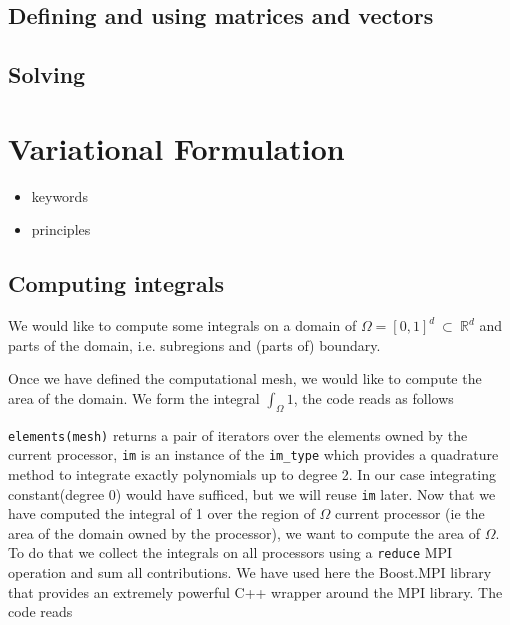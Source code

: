 \documentclass[a4paper]{book}
\newcommand{\cpp}{C{\hspace{-.3em}\vspace{-.2em}\tiny++}\xspace}
\begin{document}
\subsection{Defining and using matrices and vectors}
\label{sec:defin-using-matr}

\subsection{Solving}
\label{sec:solving}


\section{Variational Formulation}
\label{sec:vari-form}

\begin{itemize}
\item keywords
\item principles
\end{itemize}

\subsection{Computing integrals}
\label{sec:computing-integrals}

We would like to compute some integrals on a domain of $\Omega=[0,1]^d\ \subset\ \mathbb{R}^d$
and parts of the domain, i.e. subregions and (parts of) boundary.

Once we have defined the computational mesh, we would like to compute
the area of the domain. We form the integral $\int_\Omega 1$, the code
reads as follows



\lstinline!elements(mesh)! returns a pair of iterators over the
elements owned by the current processor, \lstinline!im! is an instance
of the \lstinline!im_type! which provides a quadrature method to
integrate exactly polynomials up to degree 2. In our case integrating
constant(degree 0) would have sufficed, but we will reuse
\lstinline!im! later. Now that we have computed the integral of 1 over
the region of $\Omega$ current processor (ie the area of the domain
owned by the processor), we want to compute the area of $\Omega$. To
do that we collect the integrals on all processors using a
\lstinline!reduce! MPI operation and sum all contributions. We have
used here the Boost.MPI library that provides an extremely powerful
\cpp wrapper around the MPI library. The code reads
\end{document}
